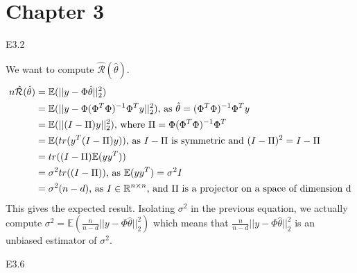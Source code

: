 \section{Chapter 3}
\begin{questions}
\question E3.2 

\begin{solution}
    We want to compute $\hat{\mathcal{R}}({\hat{\theta}})$. 
$$
\begin{aligned}
n\hat{\mathcal{R}}({\hat{\theta}}) &= \mathbb{E}(||y-\Phi \hat{\theta}||_2^2) \\
&= \mathbb{E}(||y-\Phi (\Phi^T \Phi)^{-1} \Phi^T y||_2^2) \text{, as } \hat{\theta} = (\Phi^T \Phi)^{-1} \Phi^T y\\
&= \mathbb{E}(||(I-\Pi)y||_2^2) \text{, where } \Pi = \Phi (\Phi^T \Phi)^{-1} \Phi^T \\
&= \mathbb{E}(tr(y^T (I-\Pi) y)) \text{, as } I - \Pi \text{ is symmetric and } (I - \Pi)^2 = I - \Pi \\
&= tr((I-\Pi)\mathbb{E}(yy^T)) \\
&= \sigma^2 tr((I-\Pi)) \text{, as } \mathbb{E}(yy^T) = \sigma^2 I \\
&= \sigma^2 (n-d) \text{, as } I \in \mathbb{R}^{n\times n} \text{, and } \Pi \text{ is a projector on a space of dimension d} \\
\end{aligned}
$$
This gives the expected result.
Isolating $\sigma^2$ in the previous equation, we actually compute $\sigma^2 = \mathbb{E}(\frac{n}{n-d} ||y-\Phi \hat{\theta}||_2^2)$ which means that $\frac{n}{n-d} ||y-\Phi \hat{\theta}||_2^2$ is an unbiased estimator of $\sigma^2$.
\end{solution}

\question E3.6


\end{questions}
